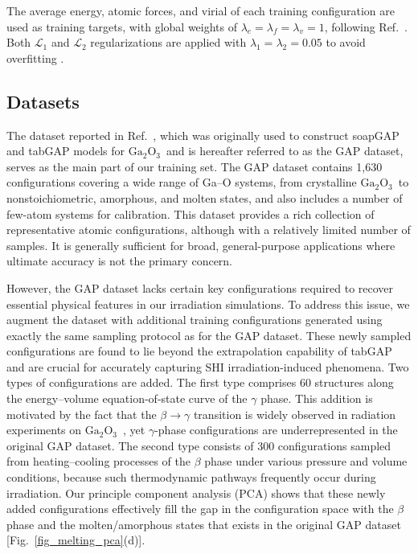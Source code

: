 \documentclass[%
reprint,
superscriptaddress,
 amsmath,amssymb,
 aps,
]{revtex4-2}
\newcommand{\ga}{$\text{Ga}_2\text{O}_3$}
\begin{document}
The average energy, atomic forces, and virial of each training configuration are used as training targets, 
with global weights of $\lambda_e=\lambda_f=\lambda_v=1$, following Ref.~\cite{liang_nep89_2025}. 
Both $\mathcal{L}_1$ and $\mathcal{L}_2$ regularizations are applied with $\lambda_1=\lambda_2=0.05$ to 
avoid overfitting \cite{fan_gpumd_2022}.

\subsection{Datasets}

The dataset reported in Ref.~\cite{zhao_complex_2023}, which was originally used to construct 
soapGAP and tabGAP models for \ga\ and is hereafter referred to as the GAP dataset, 
serves as the main part of our training set.
The GAP dataset contains 1,630 configurations covering a wide range of Ga--O systems, 
from crystalline \ga\ to nonstoichiometric, amorphous, and molten states, 
and also includes a number of few-atom systems for calibration.
This dataset provides a rich collection of representative atomic configurations, although with 
a relatively limited number of samples. 
It is generally sufficient for broad, general-purpose applications where ultimate accuracy 
is not the primary concern.

However, the GAP dataset lacks certain key configurations required 
to recover essential physical features in our irradiation simulations. 
To address this issue, we augment the dataset with additional training configurations generated 
using exactly the same sampling protocol as for the GAP dataset.
These newly sampled configurations are found to lie beyond the extrapolation capability of tabGAP 
and are crucial for accurately capturing SHI irradiation-induced phenomena.
Two types of configurations are added. 
The first type comprises 60 structures along the energy--volume 
equation-of-state curve of the $\gamma$ phase. 
This addition is motivated by the fact that 
the $\beta \to \gamma$ transition is widely observed in radiation experiments on \ga\ 
\cite{zhao_crystallization_2025,han_electronic_2025,abdullaev_ions_2025}, 
yet $\gamma$-phase configurations are underrepresented in the original GAP dataset. 
The second type consists of 300 configurations sampled from heating--cooling processes 
of the $\beta$ phase under various pressure and volume conditions,
because such thermodynamic pathways frequently occur during irradiation.
Our principle component analysis (PCA) shows that these newly added configurations 
effectively fill the gap in the configuration space with the $\beta$ phase 
and the molten/amorphous states that exists in the original GAP dataset [Fig.~\ref{fig_melting_pca}(d)].
\end{document}
